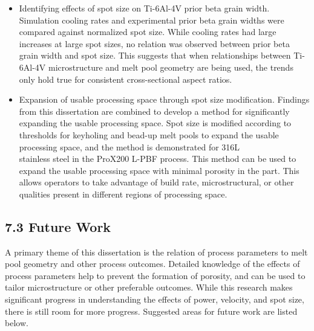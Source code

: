 \documentclass[10pt]{article}
\begin{document}
\begin{itemize}
  \item Identifying effects of spot size on Ti-6Al-4V prior beta grain width. Simulation cooling rates and experimental prior beta grain widths were compared against normalized spot size. While cooling rates had large increases at large spot sizes, no relation was observed between prior beta grain width and spot size. This suggests that when relationships between Ti-6Al-4V microstructure and melt pool geometry are being used, the trends only hold true for consistent cross-sectional aspect ratios.

  \item Expansion of usable processing space through spot size modification. Findings from this dissertation are combined to develop a method for significantly expanding the usable processing space. Spot size is modified according to thresholds for keyholing and bead-up melt pools to expand the usable processing space, and the method is demonstrated for 316L\\
stainless steel in the ProX200 L-PBF process. This method can be used to expand the usable processing space with minimal porosity in the part. This allows operators to take advantage of build rate, microstructural, or other qualities present in different regions of processing space.

\end{itemize}

\subsection*{7.3 Future Work}
A primary theme of this dissertation is the relation of process parameters to melt pool geometry and other process outcomes. Detailed knowledge of the effects of process parameters help to prevent the formation of porosity, and can be used to tailor microstructure or other preferable outcomes. While this research makes significant progress in understanding the effects of power, velocity, and spot size, there is still room for more progress. Suggested areas for future work are listed below.
\end{document}
